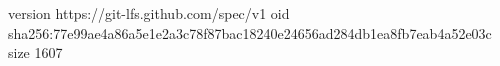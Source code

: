 version https://git-lfs.github.com/spec/v1
oid sha256:77e99ae4a86a5e1e2a3c78f87bac18240e24656ad284db1ea8fb7eab4a52e03c
size 1607
